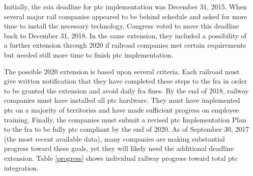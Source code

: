 \documentclass[11pt, titlepage]{article}
\begin{document}
Initially, the \gls{rsia} deadline for \gls{ptc} implementation was December 31,
2015. When several major rail companies appeared to be behind schedule and asked
for more time to install the necessary technology, Congress voted to move this
deadline back to December 31, 2018. In the same extension, they included a
possibility of a further extension through 2020 if railroad companies met certain
requirements but needed still more time to finish \gls{ptc} implementation.

The possible 2020 extension is based upon several criteria. Each railroad must
give written notification that they have completed these steps to the \gls{fra}
in order to be granted the extension and avoid daily \gls{fra} fines. By the end
of 2018, railway companies must have installed all \gls{ptc} hardware. They must
have implemented \gls{ptc} on a majority of territories and have made sufficient
progress on employee training. Finally, the companies must submit a revised
\gls{ptc} Implementation Plan to the \gls{fra} to be fully \gls{ptc} compliant by
the end of 2020. As of September 30, 2017 (the most recent available data), many
companies are making substantial progress toward these goals, yet they will likely
need the additional deadline extension. Table \ref{progress} shows individual
railway progress toward total \gls{ptc} integration.
\end{document}
